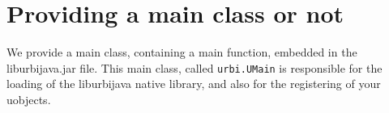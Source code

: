 %
%
%
%
%
%
%
%
%
%
%


\section{Providing a main class or not}

We provide a main class, containing a main function, embedded in the liburbijava.jar file. This main class,
called \lstinline{urbi.UMain} is responsible for the loading of the liburbijava native library, and also
for the registering of your uobjects.

